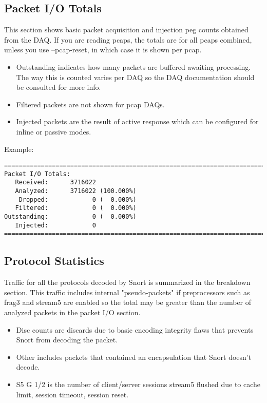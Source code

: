 \documentclass[english]{report}
\begin{document}
\subsection{Packet I/O Totals}

This section shows basic packet acquisition and injection peg counts obtained
from the DAQ.  If you are reading pcaps, the totals are for all pcaps combined,
unless you use --pcap-reset, in which case it is shown per pcap.

\begin{itemize}
\item Outstanding indicates how many packets are buffered awaiting processing.
The way this is counted varies per DAQ so the DAQ documentation should be
consulted for more info.

\item Filtered packets are not shown for pcap DAQs.

\item Injected packets are the result of active response which can be
configured for inline or passive modes.
\end{itemize}

Example:

\begin{verbatim}
===============================================================================
Packet I/O Totals:
   Received:      3716022
   Analyzed:      3716022 (100.000%)
    Dropped:            0 (  0.000%)
   Filtered:            0 (  0.000%)
Outstanding:            0 (  0.000%)
   Injected:            0
===============================================================================
\end{verbatim}


\subsection{Protocol Statistics}

Traffic for all the protocols decoded by Snort is summarized in the breakdown
section.  This traffic includes internal "pseudo-packets" if preprocessors such
as frag3 and stream5 are enabled so the total may be greater than the number of
analyzed packets in the packet I/O section.

\begin{itemize}
\item Disc counts are discards due to basic encoding integrity flaws that
prevents Snort from decoding the packet.

\item Other includes packets that contained an encapsulation that Snort doesn't
decode.

\item S5 G 1/2 is the number of client/server sessions stream5 flushed due to
cache limit, session timeout, session reset.
\end{itemize}
\end{document}
